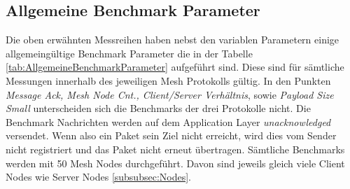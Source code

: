\begin{table}[h]
\centering
{}
\caption{Bedeutung Benchmark Parameter}
\label{tab:BedeutungBenchmarkParameter}
\end{table}


\subsection{Allgemeine Benchmark Parameter}\label{subsec:AllgemeineBenchmarkParameter}

Die oben erwähnten Messreihen haben nebst den variablen Parametern einige allgemeingültige Benchmark Parameter die in der Tabelle \ref{tab:AllgemeineBenchmarkParameter} aufgeführt sind.
Diese sind für sämtliche Messungen innerhalb des jeweiligen Mesh Protokolls gültig.
In den Punkten \textit{Message Ack, Mesh Node Cnt., Client/Server Verhältnis}, sowie \textit{Payload Size Small} unterscheiden sich die Benchmarks der drei Protokolle nicht.
Die Benchmark Nachrichten werden auf dem Application Layer \textit{unacknowledged} versendet. Wenn also ein Paket sein Ziel nicht erreicht, wird dies vom Sender nicht registriert und das Paket nicht erneut übertragen.
Sämtliche Benchmarks werden mit 50 Mesh Nodes durchgeführt. Davon sind jeweils gleich viele Client Nodes wie Server Nodes \ref{subsubsec:Nodes}.

